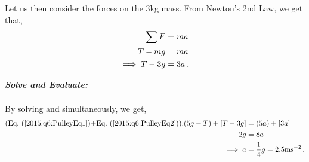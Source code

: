 \begin{subquestions}
Let us then consider the forces on the 3kg mass. From Newton's 2nd Law, we get that,
\begin{align}
	\sum F & = ma \nonumber \\
	 T-mg & = ma \nonumber \\
	\implies T-3g & = 3a \,. \label{2015:q6:PulleyEq2}
\end{align}




\textbf{\textit{Solve and Evaluate:}} \\ \\
By solving  and  simultaneously, we get,
\begin{align}
	\text{(\req{2015:q6:PulleyEq1}+\req{2015:q6:PulleyEq2}):} (5g-T)+[T-3g] & = (5a)+[3a] \nn \\
																	2g & = 8a \nn \\
																	\implies a & = \frac{1}{4}g = 2.5\text{ms}^{-2} \,.
\end{align}




\end{subquestions}